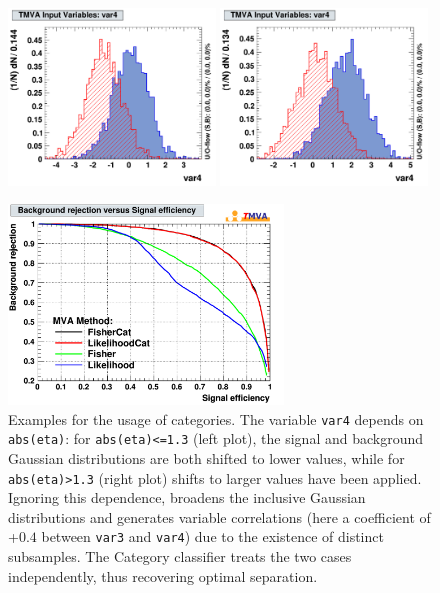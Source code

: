 \begin{figure}[p]
\begin{center}
  \includegraphics[width=0.49\textwidth]{plots/category_var4_cat1}
  \hspace{-0.0cm}
  \includegraphics[width=0.49\textwidth]{plots/category_var4_cat2}
\end{center}
\vspace{-0.6cm}
\caption[.]{Examples for the usage of categories. The variable {\tt var4} depends 
            on {\tt abs(eta)}: for {\tt abs(eta)<=1.3} (left plot), the signal and 
            background Gaussian distributions are both shifted to lower values, while 
            for {\tt abs(eta)>1.3} (right plot) shifts to larger values have been applied. 
            Ignoring this dependence, broadens the inclusive Gaussian distributions
            and generates variable correlations (here a coefficient of +$0.4$ between {\tt var3} 
            and {\tt var4}) due to the existence of distinct subsamples. The Category 
            classifier treats the two cases independently, thus recovering optimal 
            separation.}
\label{fig:cat:absetacats}
\vspace{0.7cm}
\begin{center}
  \includegraphics[width=0.65\textwidth]{plots/category_rejBvsS}

\end{center}
\end{figure}
